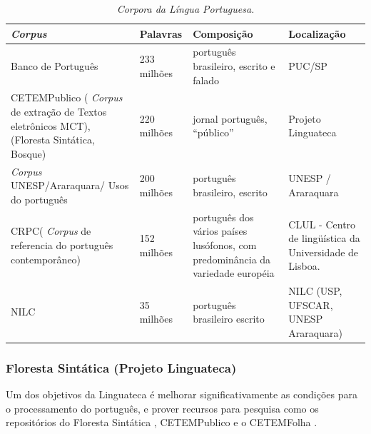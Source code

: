 \begin{table}
   \centering
   \small
   \caption{\it Corpora da Língua Portuguesa.}

    \begin{tabular}{ | p{5cm} | p{3cm} | p{3cm} | p{3cm} | }
      \hline
        \textbf{\emph{Corpus}} & \textbf{Palavras} & \textbf{Composição}& \textbf{Localização}\\
        \hline
        \hline

        Banco de Português &  233 milhões & português brasileiro, escrito e falado & PUC/SP \\

        \hline

        CETEMPublico ( \emph{Corpus} de extração de Textos eletrônicos MCT), (Floresta Sintática, Bosque) & 220 milhões & jornal português, ``público'' & Projeto Linguateca \\

        \hline

        \emph{Corpus} UNESP/Araraquara/ Usos do português & 200 milhões & português brasileiro, escrito & UNESP / Araraquara \\

        \hline

        CRPC( \emph{Corpus} de referencia do português contemporâneo) & 152 milhões & português dos vários países lusófonos, com predominância da variedade européia & CLUL - Centro de lingüística da Universidade de Lisboa. \\

        \hline

        NILC & 35 milhões & português brasileiro escrito & NILC (USP, UFSCAR, UNESP Araraquara) \\
    \hline

   \end{tabular}
   \label{tbl:corpora_port}
\end{table}

\subsubsection{Floresta Sintática (Projeto Linguateca)}
\label{sub:sub_linguateca}

Um dos objetivos da Linguateca é melhorar significativamente as condições para o processamento do português, e prover recursos para pesquisa como os repositórios do Floresta Sintática , CETEMPublico e o CETEMFolha .

